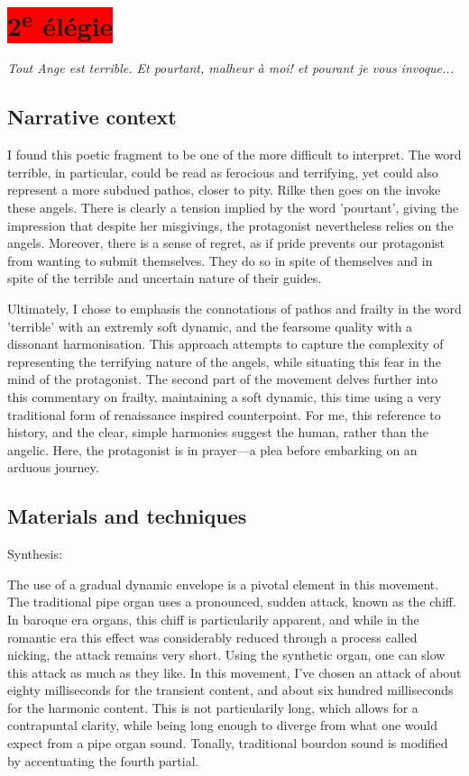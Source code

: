 \documentclass[12pt,twoside,maitrise]{dms_ks}
\theoremstyle{definition}
\begin{document}
{

\section{\colorbox{red}{2\textsuperscript{e} élégie}}

\epigraph{\textit{Tout Ange est terrible. Et pourtant, malheur à moi! et pourant je vous invoque...}}{}

\subsection{Narrative context}

I found this poetic fragment to be one of the more difficult to interpret. 
The word terrible, in particular, could be read as ferocious and terrifying, yet could also represent a more subdued pathos, closer to pity.
Rilke then goes on the invoke these angels.
There is clearly a tension implied by the word 'pourtant', giving the impression that despite her misgivings, the protagonist nevertheless relies on the angels.
Moreover, there is a sense of regret, as if pride prevents our protagonist from wanting to submit themselves.
They do so in spite of themselves and in spite of the terrible and uncertain nature of their guides.

Ultimately, I chose to emphasis the connotations of pathos and frailty in the word 'terrible' with an extremly soft dynamic, and the fearsome quality with a dissonant harmonisation.
This approach attempts to capture the complexity of representing the terrifying nature of the angels, while situating this fear in the mind of the protagonist.
The second part of the movement delves further into this commentary on frailty, maintaining a soft dynamic, this time using a very traditional form of renaissance inspired counterpoint.
For me, this reference to history, and the clear, simple harmonies suggest the human, rather than the angelic.
Here, the protagonist is in prayer---a plea before embarking on an arduous journey.

\subsection{Materials and techniques}

Synthesis:

The use of a gradual dynamic envelope is a pivotal element in this movement.
The traditional pipe organ uses a pronounced, sudden attack, known as the chiff.
In baroque era organs, this chiff is particularily apparent, and while in the romantic era this effect was considerably reduced through a process called nicking, the attack remains very short.
Using the synthetic organ, one can slow this attack as much as they like. 
In this movement, I've chosen an attack of about eighty milliseconds for the transient content, and about six hundred milliseconds for the harmonic content. This is not particularily long, which allows for a contrapuntal clarity, while being long enough to diverge from what one would expect from a pipe organ sound.
Tonally, traditional bourdon sound is modified by accentuating the fourth partial.

}
\end{document}
